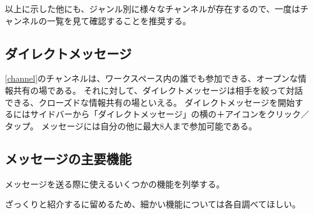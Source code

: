 \documentclass[lualatex,ja=standard,12pt,a4j]{bxjsbook}
\begin{document}
            	以上に示した他にも、ジャンル別に様々なチャンネルが存在するので、一度はチャンネルの一覧を見て確認することを推奨する。
                
   			\subsection{ダイレクトメッセージ\label{directmessage}}
            	\ref{channel}のチャンネルは、ワークスペース内の誰でも参加できる、オープンな情報共有の場である。
                それに対して、ダイレクトメッセージは相手を絞って対話できる、クローズドな情報共有の場といえる。
                ダイレクトメッセージを開始するにはサイドバーから「ダイレクトメッセージ」の横の＋アイコンをクリック／タップ。
                メッセージには自分の他に最大8人まで参加可能である。
            
            \subsection{メッセージの主要機能}
            	メッセージを送る際に使えるいくつかの機能を列挙する。
                
                ざっくりと紹介するに留めるため、細かい機能については各自調べてほしい。
                
\end{document}
